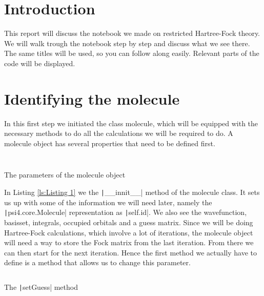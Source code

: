 \documentclass[%
    paper=A4,               %
    twoside=true,           %
    openany,              %
    parskip=full,           %
    chapterprefix=true,     %
    11pt,                   %
    headings=normal,        %
    bibliography=totoc,     %
    listof=totoc,           %
    titlepage=on,           %
    captions=tableabove,    %
    draft=false,            %
]{scrreprt}
\numberwithin{equation}{section}
\begin{document}
    
    \clearpage
    \section{Introduction}
    \label{sec:intro}
    This report will discuss the notebook we made on restricted Hartree-Fock theory. We will walk trough the notebook step by step and discuss what we see there. The same titles will be used, so you can follow along easily. Relevant parts of the code will be displayed.
    
    \section{Identifying the molecule}
    \label{sec:step1}
    In this first step we initiated the class molecule, which will be equipped with the necessary methods to do all the calculations we will be required to do. A molecule object has several properties that need to be defined first. 
    
    \begin{listing}[ht]
        \centering
        \inputminted[firstline=12, lastline=12, gobble=4]{python}{Hartree_FockL.py}
        \inputminted[firstline=23, lastline=36, gobble=4]{python}{Hartree_FockL.py}
        \caption{The parameters of the molecule object}
        \label{ls:Listing 1}
    \end{listing}
    In Listing \ref{ls:Listing 1} we the \texttt|__innit__| method of the molecule class. It sets us up with some of the information we will need later, namely the \texttt|psi4.core.Molecule| representation as \texttt|self.id|. We also see the wavefunction, basisset, integrals, occupied orbitals and a guess matrix. Since we will be doing Hartree-Fock calculations, which involve a lot of iterations, the molecule object will need a way to store the Fock matrix from the last iteration. From there we can then start for the next iteration. Hence the first method we actually have to define is a method that allows us to change this parameter.
    
    \begin{listing}[ht]
        \centering
        \inputminted[firstline=38, lastline=46, gobble=4]{python}{Hartree_FockL.py}
        \caption{The \texttt|setGuess| method}
        \label{ls: Listing 2}
    \end{listing}
    
\end{document}
